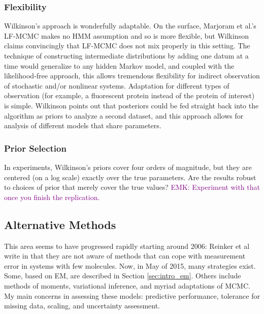 \documentclass{article}
\newcommand\EMK[1]{\textcolor{purple}{EMK: #1}}
\begin{document}
\subsubsection{Flexibility}
Wilkinson's approach is wonderfully adaptable. On the surface, Marjoram et al.'s LF-MCMC makes no HMM assumption and so is more flexible, but Wilkinson claims convincingly that LF-MCMC does not mix properly in this setting. The technique of constructing intermediate distributions by adding one datum at a time would generalize to any hidden Markov model, and coupled with the likelihood-free approach, this allows tremendous flexibility for indirect observation of stochastic and/or nonlinear systems. Adaptation for different types of observation (for example, a fluorescent protein instead of the protein of interest) is simple. Wilkinson points out that posteriors could be fed straight back into the algorithm as priors to analyze a second dataset, and this approach allows for analysis of different models that share parameters.

\subsubsection{Prior Selection}
In experiments, Wilkinson's priors cover four orders of magnitude, but they are centered (on a log scale) exactly over the true parameters. Are the results robust to choices of prior that merely cover the true values? \EMK{Experiment with that once you finish the replication.}

\subsection{Alternative Methods}
This area seems to have progressed rapidly starting around 2006: Reinker et al write in \cite{reinker2006parameter} that they are not aware of methods that can cope with measurement error in systems with few molecules. Now, in May of 2015, many strategies exist. Some, based on EM, are described in Section \ref{sec:intro_em}. Others include methods of moments, variational inference, and myriad adaptations of MCMC. My main concerns in assessing these models: predictive performance, tolerance for missing data, scaling, and uncertainty assessment.
\end{document}
